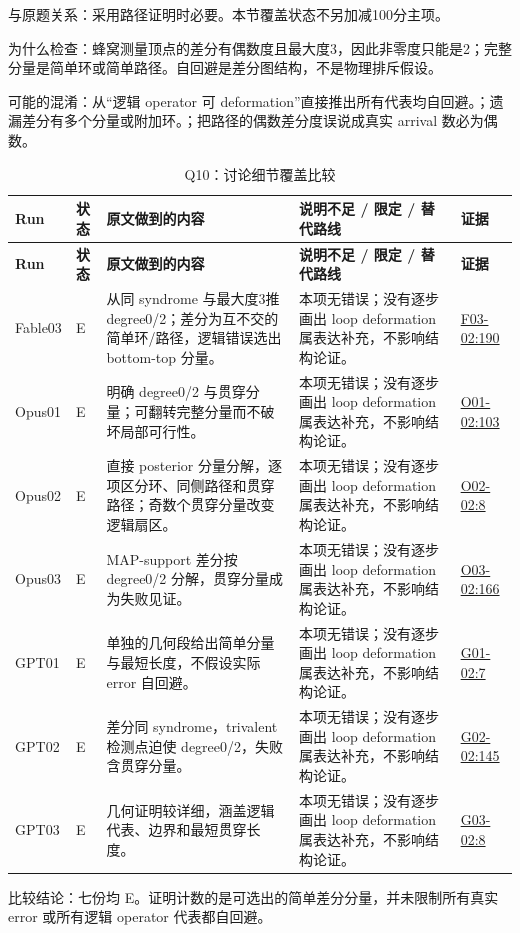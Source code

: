 \documentclass[11pt,a4paper]{article}
\begin{document}
与原题关系：采用路径证明时必要。本节覆盖状态不另加减100分主项。

为什么检查：蜂窝测量顶点的差分有偶数度且最大度3，因此非零度只能是2；完整分量是简单环或简单路径。自回避是差分图结构，不是物理排斥假设。

可能的混淆：从“逻辑 operator 可 deformation”直接推出所有代表均自回避。；遗漏差分有多个分量或附加环。；把路径的偶数差分度误说成真实 arrival 数必为偶数。

{\fontsize{9.0}{12.6}\selectfont
\setlength{\tabcolsep}{2.5pt}
\begin{longtable}{>{\raggedright\arraybackslash}p{}>{\raggedright\arraybackslash}p{}>{\raggedright\arraybackslash}p{}>{\raggedright\arraybackslash}p{}>{\raggedright\arraybackslash}p{}}
\caption{Q10：讨论细节覆盖比较}\\
\toprule
\textbf{Run} & \textbf{状态} & \textbf{原文做到的内容} & \textbf{说明不足 / 限定 / 替代路线} & \textbf{证据}\tabularnewline
\midrule
\endfirsthead
\toprule
\textbf{Run} & \textbf{状态} & \textbf{原文做到的内容} & \textbf{说明不足 / 限定 / 替代路线} & \textbf{证据}\tabularnewline
\midrule
\endhead
{}Fable03 & E & 从同 syndrome 与最大度3推 degree0/2；差分为互不交的简单环/路径，逻辑错误选出 bottom-top 分量。 & 本项无错误；没有逐步画出 loop deformation 属表达补充，不影响结构论证。 & \hyperref[src:F03-02]{F03-02:190}\tabularnewline
{}Opus01 & E & 明确 degree0/2 与贯穿分量；可翻转完整分量而不破坏局部可行性。 & 本项无错误；没有逐步画出 loop deformation 属表达补充，不影响结构论证。 & \hyperref[src:O01-02]{O01-02:103}\tabularnewline
{}Opus02 & E & 直接 posterior 分量分解，逐项区分环、同侧路径和贯穿路径；奇数个贯穿分量改变逻辑扇区。 & 本项无错误；没有逐步画出 loop deformation 属表达补充，不影响结构论证。 & \hyperref[src:O02-02]{O02-02:8}\tabularnewline
{}Opus03 & E & MAP-support 差分按 degree0/2 分解，贯穿分量成为失败见证。 & 本项无错误；没有逐步画出 loop deformation 属表达补充，不影响结构论证。 & \hyperref[src:O03-02]{O03-02:166}\tabularnewline
{}GPT01 & E & 单独的几何段给出简单分量与最短长度，不假设实际 error 自回避。 & 本项无错误；没有逐步画出 loop deformation 属表达补充，不影响结构论证。 & \hyperref[src:G01-02]{G01-02:7}\tabularnewline
{}GPT02 & E & 差分同 syndrome，trivalent 检测点迫使 degree0/2，失败含贯穿分量。 & 本项无错误；没有逐步画出 loop deformation 属表达补充，不影响结构论证。 & \hyperref[src:G02-02]{G02-02:145}\tabularnewline
{}GPT03 & E & 几何证明较详细，涵盖逻辑代表、边界和最短贯穿长度。 & 本项无错误；没有逐步画出 loop deformation 属表达补充，不影响结构论证。 & \hyperref[src:G03-02]{G03-02:8}\tabularnewline
\bottomrule
\end{longtable}
}
比较结论：七份均 E。证明计数的是可选出的简单差分分量，并未限制所有真实 error 或所有逻辑 operator 代表都自回避。
\end{document}
